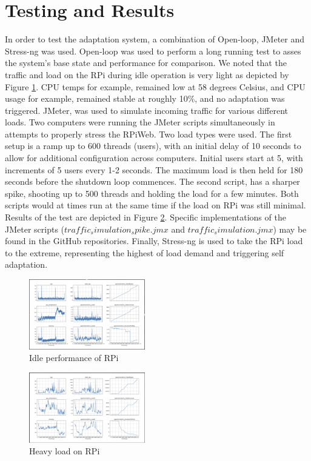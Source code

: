 \documentclass[conference]{IEEEtran}
\begin{document}
\section{\textbf{Testing and Results}}\label{test_and_results}
In order to test the adaptation system, a combination of Open-loop, JMeter and Stress-ng was used. Open-loop was used to perform a long running test to asses the system's base state and performance for comparison. We noted that the traffic and load on the RPi during idle operation is very light as depicted by Figure \ref{fig:idle_graphs}. CPU temps for example, remained low at 58 degrees Celsius, and CPU usage for example, remained stable at roughly 10\%, and no adaptation was triggered. JMeter, was used to simulate incoming traffic for various different loads. Two computers were running the JMeter scripts simultaneously in attempts to properly stress the RPiWeb. Two load types were used. The first setup is a ramp up to 600 threads (users), with an initial delay of 10 seconds to allow for additional configuration across computers. Initial users start at 5, with increments of 5 users every 1-2 seconds. The maximum load is then held for 180 seconds before the shutdown loop commences. The second script, has a sharper spike, shooting up to 500 threads and holding the load for a few minutes. Both scripts would at times run at the same time if the load on RPi was still minimal. Results of the test are depicted in Figure \ref{fig:heavy_load}. Specific implementations of the JMeter scripts ($traffic_simulation_spike.jmx$ and $traffic_simulation.jmx$) may be found in the GitHub repositories. Finally, Stress-ng is used to take the RPi load to the extreme, representing the highest of load demand and triggering self adaptation.

\begin{figure}[H]
    \centering
    \includegraphics[width=0.45\textwidth]{./media/idle_graphs.png}
    \caption{Idle performance of RPi}
    \label{fig:idle_graphs}
\end{figure}

\begin{figure}[H]
    \centering
    \includegraphics[width=0.45\textwidth]{./media/heavy_load.png}
    \caption{Heavy load on RPi}
    \label{fig:heavy_load}
\end{figure}
\end{document}
